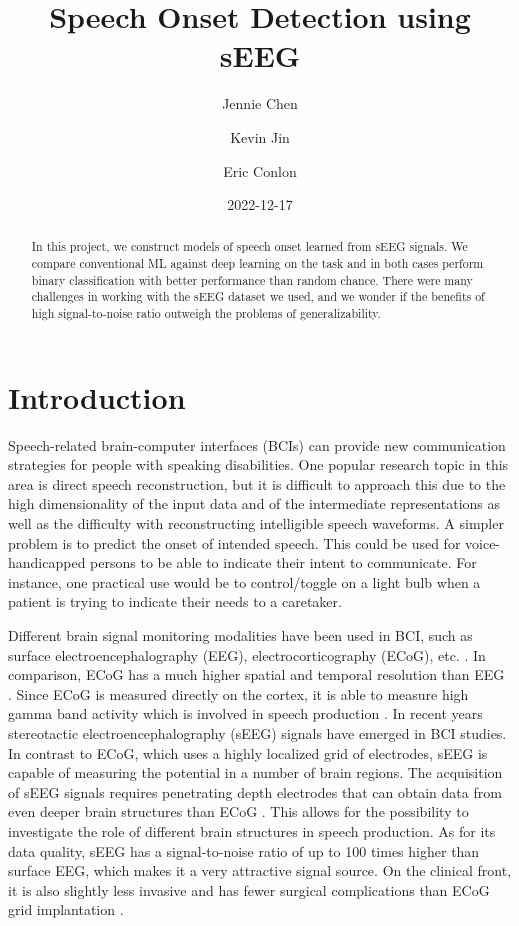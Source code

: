 \documentclass[format=sigconf, nonacm=true, review=true, screen=true]{acmart}
\title{Speech Onset Detection using sEEG}
\author{Jennie Chen}
\author{Kevin Jin}
\author{Eric Conlon}
\date{2022-12-17}
\begin{document}
\begin{abstract}

In this project, we construct models of speech onset learned from sEEG signals. We compare conventional ML against deep learning on the task and in both cases perform binary classification with better performance than random chance. There were many challenges in working with the sEEG dataset we used, and we wonder if the benefits of high signal-to-noise ratio outweigh the problems of generalizability.

\end{abstract}

\maketitle

\section{Introduction}

Speech-related brain-computer interfaces (BCIs) can provide new communication strategies for people with speaking disabilities. One popular research topic in this area is direct speech reconstruction, but it is difficult to approach this due to the high dimensionality of the input data and of the intermediate representations as well as the difficulty with reconstructing intelligible speech waveforms. \cite{saha2019deep} A simpler problem is to predict the onset of intended speech. This could be used for voice-handicapped persons to be able to indicate their intent to communicate. For instance, one practical use would be to control/toggle on a light bulb when a patient is trying to indicate their needs to a caretaker.

Different brain signal monitoring modalities have been used in BCI, such as surface electroencephalography (EEG), electrocorticography (ECoG), etc. \cite{herff2020potential}. In comparison, ECoG has a much higher spatial and temporal resolution than EEG \cite{parvizi2018promises}. Since ECoG is measured directly on the cortex, it is able to measure high gamma band activity which is involved in speech production \cite{herff2020potential}. In recent years stereotactic electroencephalography (sEEG) signals have emerged in BCI studies. In contrast to ECoG, which uses a highly localized grid of electrodes, sEEG is capable of measuring the potential in a number of brain regions. The acquisition of sEEG signals requires penetrating depth electrodes that can obtain data from even deeper brain structures than ECoG \cite{herff2020potential}. This allows for the possibility to investigate the role of different brain structures in speech production. As for its data quality, sEEG has a signal-to-noise ratio of up to 100 times higher than surface EEG, which makes it a very attractive signal source. On the clinical front, it is also slightly less invasive and has fewer surgical complications than ECoG grid implantation \cite{herff2020potential}.
\end{document}
